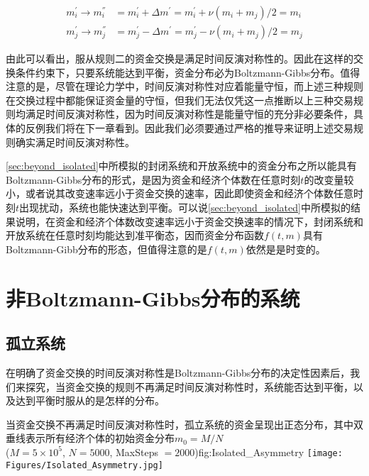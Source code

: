 \documentclass[tsinghuacite]{HustGraduPaper}
\begin{document}
		\begin{align}
			m_i^{'} \rightarrow m_{i}^{''} &= m_i^{'} + \Delta m^{'} = m_i^{'} + \nu (m_i + m_j) /2  = m_i\\
			m_j^{'} \rightarrow m_{j}^{''} &= m_j^{'} - \Delta m^{'} = m_j^{'} - \nu (m_i + m_j) /2  = m_j \label{eq31}
		\end{align}
		
		\vspace{1.5em} 

		由此可以看出，服从规则二的资金交换是满足时间反演对称性的。因此在这样的交换条件约束下，只要系统能达到平衡，资金分布必为Boltzmann-Gibbs分布。值得注意的是，尽管在理论力学中，时间反演对称性对应着能量守恒，而上述三种规则在交换过程中都能保证资金量的守恒，但我们无法仅凭这一点推断以上三种交易规则均满足时间反演对称性，因为时间反演对称性是能量守恒的充分非必要条件，具体的反例我们将在下一章看到。因此我们必须要通过严格的推导来证明上述交易规则确实满足时间反演对称性。
		
				
		\autoref{sec:beyond_isolated}中所模拟的封闭系统和开放系统中的资金分布之所以能具有Boltzmann-Gibbs分布的形式，是因为资金和经济个体数在任意时刻$t$的改变量较小，或者说其改变速率远小于资金交换的速率，因此即使资金和经济个体数任意时刻$t$出现扰动，系统也能快速达到平衡。可以说\autoref{sec:beyond_isolated}中所模拟的结果说明，在资金和经济个体数改变速率远小于资金交换速率的情况下，封闭系统和开放系统在任意时刻均能达到准平衡态，因而资金分布函数$f(t,m)$具有Boltzmann-Gibb分布的形态，但值得注意的是$f(t,m)$依然是是时变的。
		
		


		
	\newpage	
	
	
	\section{非Boltzmann-Gibbs分布的系统}\label{sec:non_boltzmann}
	
	\subsection{孤立系统}
		
	在明确了资金交换的时间反演对称性是Boltzmann-Gibbs分布的决定性因素后，我们来探究，当资金交换的规则不再满足时间反演对称性时，系统能否达到平衡，以及达到平衡时服从的是怎样的分布。
	
	\begin{generalfig}[htb]{当资金交换不再满足时间反演对称性时，孤立系统的资金呈现出正态分布，其中双垂线表示所有经济个体的初始资金分布$m_0 = M/N$ \\ ($M = 5 \times 10^5$, $N = 5000$, MaxSteps $= 2000$)}{fig:Isolated_Asymmetry}
		\texttt{[image: Figures/Isolated\_Asymmetry.jpg]}
	\end{generalfig}
		
\end{document}
